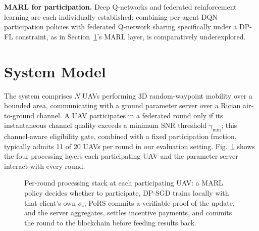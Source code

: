 \documentclass[journal]{IEEEtran}
\begin{document}
\textbf{MARL for participation.} Deep Q-networks \cite{mnih2015} and
federated reinforcement learning are each individually established;
combining per-agent DQN participation policies with federated
Q-network sharing specifically under a DP-FL constraint, as in
Section~\ref{sec:system}'s MARL layer, is comparatively underexplored.

\section{System Model}
\label{sec:system}

The system comprises $N$ UAVs performing 3D random-waypoint mobility
\cite{zhan2020} over a bounded area, communicating with a ground
parameter server over a Rician air-to-ground channel. A UAV
participates in a federated round only if its instantaneous channel
quality exceeds a minimum SNR threshold $\gamma_{\min}$; this
channel-aware eligibility gate, combined with a fixed participation
fraction, typically admits 11 of 20 UAVs per round in our evaluation
setting. Fig.~\ref{fig:architecture} shows the four processing layers
each participating UAV and the parameter server interact with every
round.

\begin{figure}[t]
\centering
{}
\caption{Per-round processing stack at each participating UAV: a MARL
policy decides whether to participate, DP-SGD trains locally with
that client's own $\sigma_i$, PoRS commits a verifiable proof of the
update, and the server aggregates, settles incentive payments, and
commits the round to the blockchain before feeding results back.}
\label{fig:architecture}
\end{figure}
\end{document}
